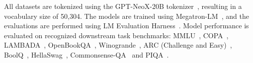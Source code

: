 


All datasets are tokenized using the GPT-NeoX-20B tokenizer~\citep{black2022gptneox}, resulting in a vocabulary size of 50,304. The models are trained using Megatron-LM~\citep{shoeybi2020megatronlmtrainingmultibillionparameter}, and the evaluations are performed using LM Evaluation Harness~\citep{eval-harness}. Model performance is evaluated on recognized downstream task benchmarks: MMLU~\citep{hendrycks2021mmlu}, COPA~\citep{copa}, LAMBADA~\citep{paperno2016lambada}, OpenBookQA~\citep{mihaylov2018openbookqa}, Winogrande~\citep{sakaguchi2020winogrande}, ARC (Challenge and Easy)~\citep{clark2018arc}, BoolQ~\citep{clark2019boolq}, HellaSwag~\citep{zellers2019hellaswag}, Commonsense-QA~\citep{talmor2019commonsenseqa} and PIQA~\citep{bisk2019piqareasoningphysicalcommonsense}. 


